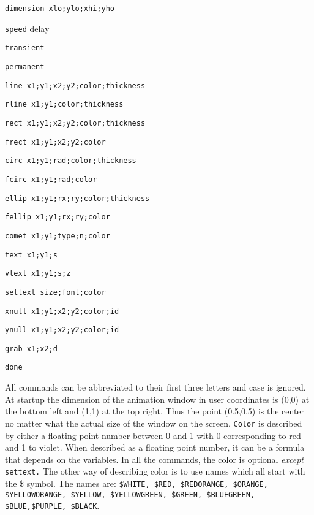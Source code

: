 \documentclass{article}
\begin{document}
\begin{description}
\item{\tt dimension xlo;ylo;xhi;yho}
\item{\tt speed} delay
\item{\tt transient}
\item{\tt permanent}
\item{\tt line x1;y1;x2;y2;color;thickness}
\item{\tt rline x1;y1;color;thickness}
\item{\tt rect x1;y1;x2;y2;color;thickness}
\item{\tt frect x1;y1;x2;y2;color}
\item{\tt circ x1;y1;rad;color;thickness}
\item{\tt fcirc x1;y1;rad;color}
\item{\tt ellip x1;y1;rx;ry;color;thickness}
\item{\tt fellip x1;y1;rx;ry;color}
\item{\tt comet x1;y1;type;n;color}
\item{\tt text x1;y1;s}
\item{\tt vtext x1;y1;s;z}
\item{\tt settext size;font;color}
\item{\tt xnull x1;y1;x2;y2;color;id}
\item{\tt ynull x1;y1;x2;y2;color;id}
\item{\tt grab x1;x2;d}


\item{\tt done}
\end{description}

All commands can be abbreviated to their first three letters and case
is ignored. At startup the dimension of the animation window in user
coordinates is (0,0) at the bottom left and (1,1) at the top
right. Thus the point (0.5,0.5) is the center no matter what the
actual size of the window on the screen.  {\tt Color} is described by either
a floating point number between 0 and 1 with 0 corresponding to red
and 1 to violet. When described as a floating point number, it can be
a formula that depends on the variables. In all the commands, the
color is optional {\em except} {\tt settext.}  The other way of
describing color is to use names which all start with the \$
symbol. The names are:
{\tt \$WHITE, \$RED, \$REDORANGE, \$ORANGE, \$YELLOWORANGE,
                    \$YELLOW, \$YELLOWGREEN, \$GREEN, \$BLUEGREEN,
		      \$BLUE,\$PURPLE, \$BLACK}.
\end{document}
